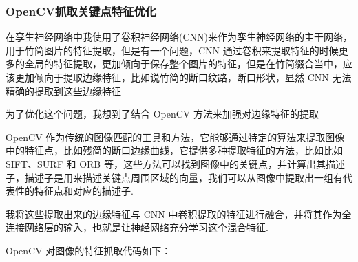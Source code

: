 \documentclass{article}
\begin{document}
\subsubsection{OpenCV抓取关键点特征优化}

在孪生神经网络中我使用了卷积神经网络(CNN)来作为孪生神经网络的主干网络，用于竹简图片的特征提取，但是有一个问题，CNN 通过卷积来提取特征的时候更多的全局的特征提取，更加倾向于保存整个图片的特征，但是在竹简缀合当中，应该更加倾向于提取边缘特征，比如说竹简的断口纹路，断口形状，显然 CNN 无法精确的提取到这些边缘特征

为了优化这个问题，我想到了结合 OpenCV 方法来加强对边缘特征的提取

OpenCV 作为传统的图像匹配的工具和方法，它能够通过特定的算法来提取图像中的特征点，比如残简的断口边缘曲线，它提供多种提取特征的方法，比如比如 SIFT、SURF 和 ORB 等，这些方法可以找到图像中的关键点，并计算出其描述子，描述子是用来描述关键点周围区域的向量，我们可以从图像中提取出一组有代表性的特征点和对应的描述子.

我将这些提取出来的边缘特征与 CNN 中卷积提取的特征进行融合，并将其作为全连接网络层的输入，也就是让神经网络充分学习这个混合特征.

OpenCV 对图像的特征抓取代码如下：
\end{document}
